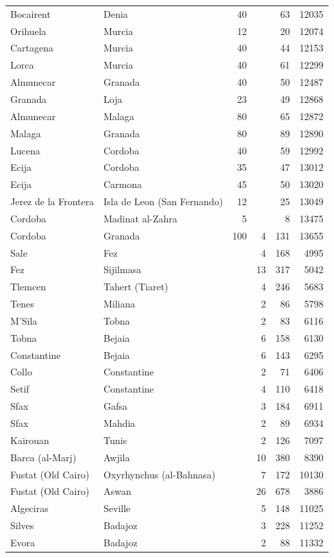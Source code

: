 \documentclass[11pt,a4paper]{article}
\begin{document}
{\begin{longtable}{p{4.2cm}p{4.2cm}rrrr}
Bocairent & Denia & 40 &  & 63 & 12035\\
Orihuela & Murcia & 12 &  & 20 & 12074\\
Cartagena & Murcia & 40 &  & 44 & 12153\\
Lorca & Murcia & 40 &  & 61 & 12299\\
Almunecar & Granada & 40 &  & 50 & 12487\\
Granada & Loja & 23 &  & 49 & 12868\\
Almunecar & Malaga & 80 &  & 65 & 12872\\
Malaga & Granada & 80 &  & 89 & 12890\\
Lucena & Cordoba & 40 &  & 59 & 12992\\
Ecija & Cordoba & 35 &  & 47 & 13012\\
Ecija & Carmona & 45 &  & 50 & 13020\\
Jerez de la Frontera & Isla de Leon (San Fernando) & 12 &  & 25 & 13049\\
Cordoba & Madinat al-Zahra & 5 &  & 8 & 13475\\
Cordoba & Granada & 100 & 4 & 131 & 13655\\
Sale & Fez &  & 4 & 168 & 4995\\
Fez & Sijilmasa &  & 13 & 317 & 5042\\
Tlemcen & Tahert (Tiaret) &  & 4 & 246 & 5683\\
Tenes & Miliana &  & 2 & 86 & 5798\\
M'Sila & Tobna &  & 2 & 83 & 6116\\
Tobna & Bejaia &  & 6 & 158 & 6130\\
Constantine & Bejaia &  & 6 & 143 & 6295\\
Collo & Constantine &  & 2 & 71 & 6406\\
Setif & Constantine &  & 4 & 110 & 6418\\
Sfax & Gafsa &  & 3 & 184 & 6911\\
Sfax & Mahdia &  & 2 & 89 & 6934\\
Kairouan & Tunis &  & 2 & 126 & 7097\\
Barca (al-Marj) & Awjila &  & 10 & 380 & 8390\\
Fustat (Old Cairo) & Oxyrhynchus (al-Bahnasa) &  & 7 & 172 & 10130\\
Fustat (Old Cairo) & Aswan &  & 26 & 678 & 3886\\
Algeciras & Seville &  & 5 & 148 & 11025\\
Silves & Badajoz &  & 3 & 228 & 11252\\
Evora & Badajoz &  & 2 & 88 & 11332\\

\end{longtable}}
\end{document}
